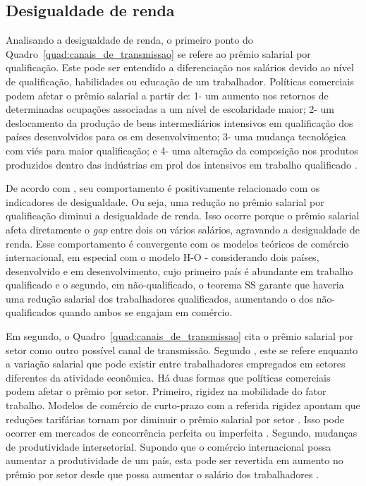 \subsection{Desigualdade de renda} \label{subsec:desigualdade_de_renda}

Analisando a desigualdade de renda, o primeiro ponto do Quadro~\ref{quad:canais_de_transmissao} se refere ao prêmio salarial por qualificação. Este pode ser entendido a diferenciação nos salários devido ao nível de qualificação, habilidades ou educação de um trabalhador. Políticas comerciais podem afetar o prêmio salarial a partir de: 1- um aumento nos retornos de determinadas ocupações associadas a um nível de escolaridade maior; 2- um deslocamento da produção de bens intermediários intensivos em qualificação dos países desenvolvidos para os em desenvolvimento; 3- uma mudança tecnológica com viés para maior qualificação; e 4- uma alteração da composição nos produtos produzidos dentro das indústrias em prol dos intensivos em trabalho qualificado \cite{goldbergpavcnik04}.

De acordo com \textcite{goldbergpavcnik04}, seu comportamento é positivamente relacionado com os indicadores de desigualdade. Ou seja, uma redução no prêmio salarial por qualificação diminui a desigualdade de renda. Isso ocorre porque o prêmio salarial afeta diretamente o \textit{gap} entre dois ou vários salários, agravando a desigualdade de renda. Esse comportamento é convergente com os modelos teóricos de comércio internacional, em especial com o modelo H-O - considerando dois países, desenvolvido e em desenvolvimento, cujo primeiro país é abundante em trabalho qualificado e o segundo, em não-qualificado, o teorema SS garante que haveria uma redução salarial dos trabalhadores qualificados, aumentando o dos não-qualificados quando ambos se engajam em comércio.

Em segundo, o Quadro~\ref{quad:canais_de_transmissao} cita o prêmio salarial por setor como outro possível canal de transmissão. Segundo \textcite{goldbergpavcnik04}, este se refere enquanto a variação salarial que pode existir entre trabalhadores empregados em setores diferentes da atividade econômica. Há duas formas que políticas comerciais podem afetar o prêmio por setor. Primeiro, rigidez na mobilidade do fator trabalho. Modelos de comércio de curto-prazo com a referida rigidez apontam que reduções tarifárias tornam por diminuir o prêmio salarial por setor \cite{heckman00}. Isso pode ocorrer em mercados de concorrência perfeita ou imperfeita \cite{harrison03}. Segundo, mudanças de produtividade intersetorial. Supondo que o comércio internacional possa aumentar a produtividade de um país, esta pode ser revertida em aumento no prêmio por setor desde que possa aumentar o salário dos trabalhadores \cite{hay01}.

